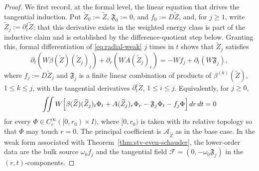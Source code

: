 \documentclass[11pt]{amsart}
\newcommand{\dd}{\,d}
\begin{document}
\begin{proof}
We first record, at the formal level, the linear equation that drives the
tangential induction. Put \(\widetilde Z_0:=\widetilde Z\), \(\mathfrak F_0:=0\), and
\(f_0:=D\widetilde Z\), and, for \(j\ge1\), write \(\widetilde Z_j:=\partial_t^j\widetilde Z\);
that this derivative exists in the weighted energy class is part of the
inductive claim and is established by the difference-quotient step below.
Granting this, formal differentiation of \eqref{eq:radial-weak} \(j\) times
in \(t\) shows that \(\widetilde Z_j\) satisfies
\begin{equation}
\label{eq:bootstrap-linear}
        \partial_t\!\left(W\beta(\widetilde Z)(\widetilde Z_j)_t\right)
        +\partial_r\!\left(WA(\widetilde Z_j)_r\right)
        =-Wf_j+\partial_t(W\mathfrak F_j),
\end{equation}
where \(f_j:=D\widetilde Z_j\) and \(\mathfrak F_j\) is a finite linear combination of
products of \(\beta^{(k)}(\widetilde Z)\), \(1\le k\le j\), with the tangential
derivatives \(\partial_t^i\widetilde Z\), \(1\le i\le j\). Equivalently, for \(j\ge0\),
\begin{equation}
\label{eq:bootstrap-weak}
        \iint W\Bigl[
        \beta(\widetilde Z)(\widetilde Z_j)_t\Phi_t+A(\widetilde Z_j)_r\Phi_r
        -\mathfrak F_j\Phi_t-f_j\Phi
        \Bigr]\dd r\dd t=0
\end{equation}
for every \(\Phi\in C_c^\infty([0,r_0)\times I)\), where \([0,r_0)\) is
taken with its relative topology so that \(\Phi\) may touch \(r=0\). The principal coefficient is
\(\mathcal A_{\widetilde Z}\) as in the base case. In the weak form associated with
Theorem~\ref{thm:stv-even-schauder}, the lower-order data are the bulk
source \(\omega_0 f_j\) and the tangential field
\(\mathcal F=(0,-\omega_0 \mathfrak F_j)\) in the \((r,t)\)-components.


\end{proof}
\end{document}

